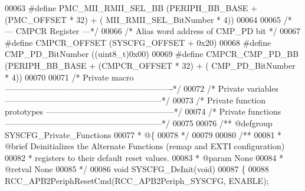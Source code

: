 \begin{DoxyCode}
00063 \textcolor{preprocessor}{#}\textcolor{preprocessor}{define} \textcolor{preprocessor}{PMC\_MII\_RMII\_SEL\_BB}       \textcolor{preprocessor}{(}PERIPH_BB_BASE \textcolor{preprocessor}{+} \textcolor{preprocessor}{(}PMC_OFFSET \textcolor{preprocessor}{*} 32\textcolor{preprocessor}{)} \textcolor{preprocessor}{+} \textcolor{preprocessor}{(}
      MII_RMII_SEL_BitNumber \textcolor{preprocessor}{*} 4\textcolor{preprocessor}{)}\textcolor{preprocessor}{)}
00064 
00065 \textcolor{comment}{/* ---  CMPCR Register ---*/}
00066 \textcolor{comment}{/* Alias word address of CMP\_PD bit */}
00067 \textcolor{preprocessor}{#}\textcolor{preprocessor}{define} \textcolor{preprocessor}{CMPCR\_OFFSET}              \textcolor{preprocessor}{(}SYSCFG_OFFSET \textcolor{preprocessor}{+} 0x20\textcolor{preprocessor}{)}
00068 \textcolor{preprocessor}{#}\textcolor{preprocessor}{define} \textcolor{preprocessor}{CMP\_PD\_BitNumber}          \textcolor{preprocessor}{(}\textcolor{preprocessor}{(}\textcolor{preprocessor}{uint8\_t}\textcolor{preprocessor}{)}0x00\textcolor{preprocessor}{)}
00069 \textcolor{preprocessor}{#}\textcolor{preprocessor}{define} \textcolor{preprocessor}{CMPCR\_CMP\_PD\_BB}           \textcolor{preprocessor}{(}PERIPH_BB_BASE \textcolor{preprocessor}{+} \textcolor{preprocessor}{(}CMPCR_OFFSET \textcolor{preprocessor}{*} 32\textcolor{preprocessor}{)} \textcolor{preprocessor}{+} \textcolor{preprocessor}{(}
      CMP_PD_BitNumber \textcolor{preprocessor}{*} 4\textcolor{preprocessor}{)}\textcolor{preprocessor}{)}
00070 
00071 \textcolor{comment}{/* Private macro -------------------------------------------------------------*/}
00072 \textcolor{comment}{/* Private variables ---------------------------------------------------------*/}
00073 \textcolor{comment}{/* Private function prototypes -----------------------------------------------*/}
00074 \textcolor{comment}{/* Private functions ---------------------------------------------------------*/}
00075 
00076 \textcolor{comment}{/** @defgroup SYSCFG\_Private\_Functions}
00077 \textcolor{comment}{  * @\{}
00078 \textcolor{comment}{  */}
00079 
00080 \textcolor{comment}{/**}
00081 \textcolor{comment}{  * @brief  Deinitializes the Alternate Functions (remap and EXTI configuration)}
00082 \textcolor{comment}{  *   registers to their default reset values.}
00083 \textcolor{comment}{  * @param  None}
00084 \textcolor{comment}{  * @retval None}
00085 \textcolor{comment}{  */}
00086 \textcolor{keywordtype}{void} SYSCFG_DeInit(\textcolor{keywordtype}{void})
00087 \{
00088    RCC_APB2PeriphResetCmd(RCC_APB2Periph_SYSCFG, ENABLE);

\end{DoxyCode}
